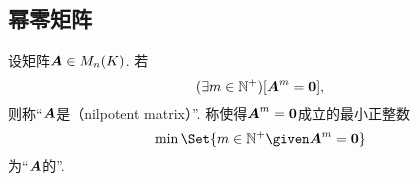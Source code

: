 \subsection{幂零矩阵}

\begin{definition}
设矩阵\(\boldsymbol{A} \in M_n(K)\).
若\begin{equation*}
	(\exists m\in\mathbb{N}^+)
	[\boldsymbol{A}^m = \boldsymbol0],
\end{equation*}
则称“\(\boldsymbol{A}\)是（nilpotent matrix）”.
称使得\(\boldsymbol{A}^m = \boldsymbol0\)成立的最小正整数\begin{equation*}
    \min\Set{ m\in\mathbb{N}^+ \given \vb{A}^m = \vb0 }
\end{equation*}为“\(\boldsymbol{A}\)的”.
\end{definition}

